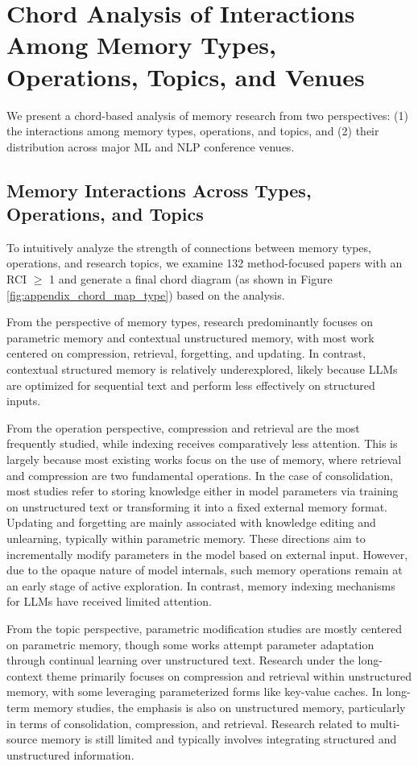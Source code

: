 \documentclass[manuscript,screen]{acmart}
\begin{document}
\section{Chord Analysis of Interactions Among Memory Types, Operations, Topics, and Venues}
We present a chord-based analysis of memory research from two perspectives: (1) the interactions among memory types, operations, and topics, and (2) their distribution across major ML and NLP conference venues.

\subsection{Memory Interactions Across Types, Operations, and Topics}
To intuitively analyze the strength of connections between memory types, operations, and research topics, we examine 132 method-focused papers with an RCI $\geq$ 1 and generate a final chord diagram (as shown in Figure \ref{fig:appendix_chord_map_type}) based on the analysis. 

From the perspective of memory types, research predominantly focuses on parametric memory and contextual unstructured memory, with most work centered on compression, retrieval, forgetting, and updating. In contrast, contextual structured memory is relatively underexplored, likely because LLMs are optimized for sequential text and perform less effectively on structured inputs.

From the operation perspective, compression and retrieval are the most frequently studied, while indexing receives comparatively less attention. This is largely because most existing works focus on the use of memory, where retrieval and compression are two fundamental operations. In the case of consolidation, most studies refer to storing knowledge either in model parameters via training on unstructured text or transforming it into a fixed external memory format. Updating and forgetting are mainly associated with knowledge editing and unlearning, typically within parametric memory. These directions aim to incrementally modify parameters in the model based on external input. However, due to the opaque nature of model internals, such memory operations remain at an early stage of active exploration. In contrast, memory indexing mechanisms for LLMs have received limited attention.

From the topic perspective, parametric modification studies are mostly centered on parametric memory, though some works attempt parameter adaptation through continual learning over unstructured text. Research under the long-context theme primarily focuses on compression and retrieval within unstructured memory, with some leveraging parameterized forms like key-value caches. In long-term memory studies, the emphasis is also on unstructured memory, particularly in terms of consolidation, compression, and retrieval. Research related to multi-source memory is still limited and typically involves integrating structured and unstructured information.
\end{document}
